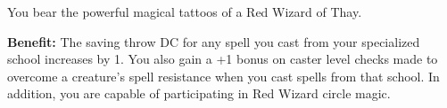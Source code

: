 
You bear the powerful magical tattoos of a Red Wizard of Thay.

\textbf{Benefit:} The saving throw DC for any spell you cast from your specialized school increases by 1. You also gain a +1 bonus on caster level checks made to overcome a creature’s spell resistance when you cast spells from that school. In addition, you are capable of participating in Red Wizard circle magic.